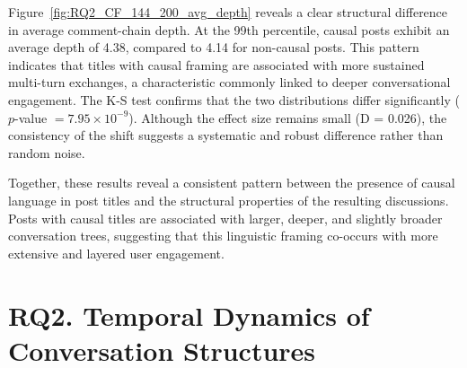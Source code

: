 \documentclass[acmsmall]{acmart}
\begin{document}
Figure~\ref{fig:RQ2_CF_144_200_avg_depth} reveals a clear structural difference in average comment-chain depth. At the 99th percentile, causal posts exhibit an average depth of 4.38, compared to 4.14 for non-causal posts. This pattern indicates that titles with causal framing are associated with more sustained multi-turn exchanges, a characteristic commonly linked to deeper conversational engagement. The K-S test confirms that the two distributions differ significantly ($p$-value $=7.95 \times 10^{-9}$). Although the effect size remains small (D = 0.026), the consistency of the shift suggests a systematic and robust difference rather than random noise.





Together, these results reveal a consistent pattern between the presence of causal language in post titles and the structural properties of the resulting discussions. Posts with causal titles are associated with larger, deeper, and slightly broader conversation trees, suggesting that this linguistic framing co-occurs with more extensive and layered user engagement.













\section{RQ2. Temporal Dynamics of Conversation Structures}
\end{document}
